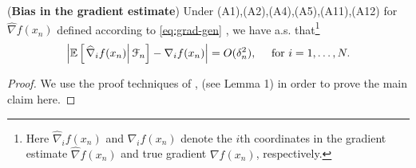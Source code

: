 \begin{lemma}(\textbf{Bias in the gradient estimate})
\label{lemma:1rdsa-bias}
Under (A1),(A2),(A4),(A5),(A11),(A12) for $\widehat\nabla f(x_n)$ defined according to  \eqref{eq:grad-gen} , we have a.s. that\footnote{Here $\widehat\nabla_i f(x_n)$ and $\nabla_i f(x_n)$ denote the $i$th coordinates in the gradient estimate $\widehat\nabla f(x_n)$ and true gradient $\nabla f(x_n)$, respectively.}
\begin{align}
 \left| \mathbb{E}\left[\left.\widehat\nabla_i f(x_n)\right| \mathcal{F}_n \right] - \nabla_i f(x_n)\right| = O(\delta_n^2),  \quad \text{ for } i=1,\ldots,N.
\end{align} 
\end{lemma}

\begin{proof}
We use the proof techniques of \cite{spall},\cite{prashanth2015rdsa} (see Lemma 1) in order to prove the main claim here.
 

\end{proof}
